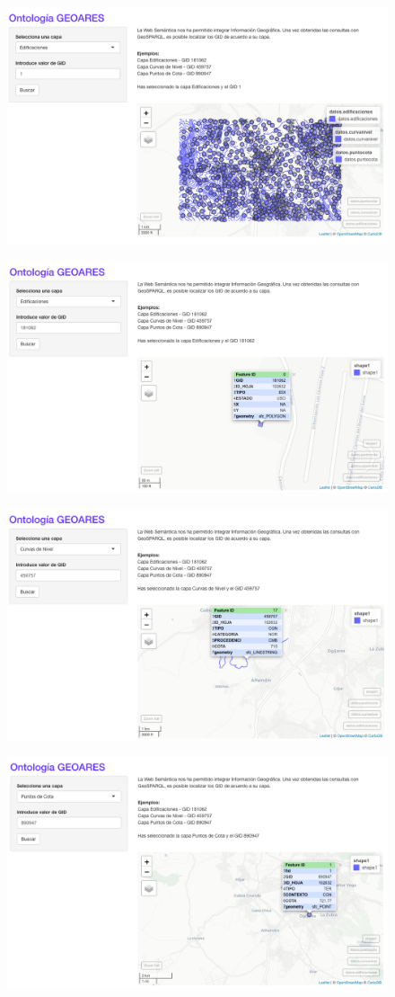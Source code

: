 \begin{figure}[H]
	\centering
	\includegraphics[width=0.7\linewidth]{imagenes/capitulo5/R1}
	\caption{}
	\label{fig:r1}
\end{figure}
\begin{figure}[H]
	\centering
	\includegraphics[width=0.7\linewidth]{imagenes/capitulo5/R2}
	\caption{}
	\label{fig:r2}
\end{figure}
\begin{figure}[H]
	\centering
	\includegraphics[width=0.7\linewidth]{imagenes/capitulo5/R3}
	\caption{}
	\label{fig:r3}
\end{figure}
\begin{figure}[H]
	\centering
	\includegraphics[width=0.7\linewidth]{imagenes/capitulo5/R4}
	\caption{}
	\label{fig:r4}
\end{figure}




